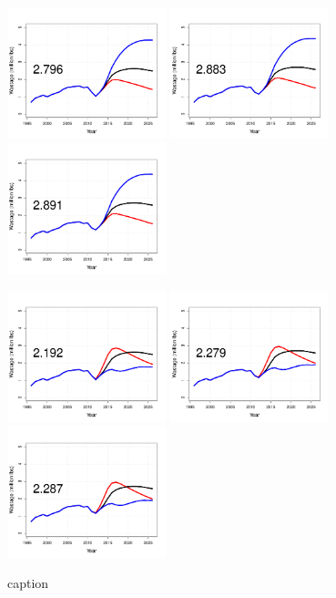 \begin{figure}[htbp]
	\centering
		\includegraphics[height=1.5in]{../FIGURES/fig_SQUO_DI_WBio.pdf}
		\includegraphics[height=1.5in]{../FIGURES/fig_BSAI_DI_WBio.pdf}
		\includegraphics[height=1.5in]{../FIGURES/fig_GULF_DI_WBio.pdf}
		
		\includegraphics[height=1.5in]{../FIGURES/fig_SQUO_DD_WBio.pdf}
		\includegraphics[height=1.5in]{../FIGURES/fig_BSAI_DD_WBio.pdf}
		\includegraphics[height=1.5in]{../FIGURES/fig_GULF_DD_WBio.pdf}
	\caption{caption}
	\label{fig:FIGURES_fig_SQUO_DI_WBio}
\end{figure}
























